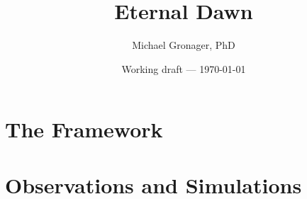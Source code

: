 \documentclass[11pt,twoside,openright,a4paper]{memoir}
\title{Eternal Dawn}
\author{Michael Gronager, PhD}
\date{Working draft --- \today}
\begin{document}
\frontmatter




\tableofcontents
% 

\mainmatter
\setcounter{chapter}{-1}


\part{The Framework}






\part{Observations and Simulations}






\appendix


\backmatter


\end{document}
